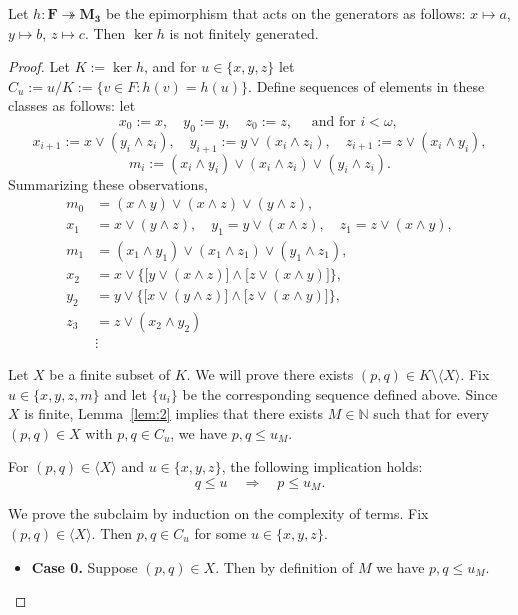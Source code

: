 \begin{proposition}
Let $h\colon \mathbf{F} \twoheadrightarrow \mathbf{M_3}$ be the epimorphism that acts on the generators as follows: $x\mapsto a$, $y\mapsto b$, $z\mapsto c.$ Then $\operatorname{ker} h$ is not finitely generated.
\end{proposition}
\begin{proof}
Let $K := \operatorname{ker} h$, and for $u \in \{x, y, z\}$ let $C_u := u/K := \{v \in F : h(v) = h(u)\}$.
Define sequences of elements in these classes as follows:
let 
\[x_0 := x, \quad y_0 := y, \quad z_0 := z, \quad \text{ and for $i< \omega$, }\]
\[
x_{i+1} := x\vee (y_i \wedge z_i), \quad y_{i+1} := y\vee (x_i \wedge z_i), \quad z_{i+1} := z\vee (x_i \wedge y_i),
\]
\[
m_i := (x_i \wedge y_i) \vee (x_i \wedge z_i)\vee (y_i \wedge z_i).
\]
Summarizing these observations,
\begin{align*}
m_0 &= (x\wedge y) \vee (x\wedge z)\vee (y\wedge z),\\
x_1 &= x \vee (y \wedge z), \quad y_1 = y \vee (x \wedge z),  \quad z_1 = z \vee (x \wedge y),\\  
m_1 &= 
 (x_1 \wedge y_1) \vee (x_1 \wedge z_1)\vee (y_1 \wedge z_1),\\
x_2 &= x \vee \bigl\{\bigl[y \vee (x \wedge z)\bigr] \wedge \bigl[z \vee (x \wedge y)\bigr]\bigr\},\\  
y_2 &= y \vee \bigl\{\bigl[x \vee (y \wedge z)\bigr] \wedge \bigl[z \vee (x \wedge y)\bigr]\bigr\},\\  
z_3 &= z \vee (x_2 \wedge y_2)\\ 
& \vdots
\end{align*}

Let $X$ be a finite subset of $K$.  We will prove there exists $(p,q) \in K \setminus \langle X \rangle$.  
Fix $u\in \{x, y, z, m\}$ and let $\{u_i\}$ be the corresponding sequence defined above. 
Since $X$ is finite, Lemma~\ref{lem:2} implies that there exists 
$M \in \mathbb{N}$ such that for every $(p, q) \in X$ with $p, q \in C_u$, we have 
$p, q \leqslant u_M$.

\begin{subclaim}\label{claim:2.1}
   For $(p,q) \in \langle X \rangle$ and $u \in \{x, y, z\}$, the following implication holds:
\begin{equation}
  \label{eq:star}
q \leqslant u \quad \Longrightarrow \quad p\leqslant u_M.
\end{equation}
\end{subclaim}
We prove the subclaim by induction on the complexity of terms.
Fix $(p,q) \in \langle X \rangle$. Then $p, q \in C_u$ for some $u\in \{x, y, z\}$.
\begin{itemize}
\item {\bf Case 0.} Suppose $(p, q) \in X$. Then by definition of $M$ we have $p, q \leqslant u_M$.


\end{itemize}
\end{proof}
